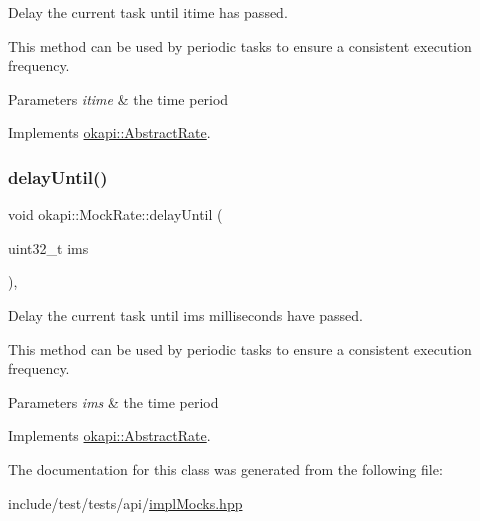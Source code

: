 Delay the current task until itime has passed. 

This method can be used by periodic tasks to ensure a consistent execution frequency.


\begin{DoxyParams}{Parameters}
{\em itime} & the time period \\
\hline
\end{DoxyParams}


Implements \mbox{\hyperlink{classokapi_1_1AbstractRate_a53a15074ca3bd0787ce34d30c068d9b2}{okapi\+::\+Abstract\+Rate}}.

\mbox{\label{classokapi_1_1MockRate_a61c3ec4590e3c7305f8882cf1b1d31d0}} 
\subsubsection{\texorpdfstring{delayUntil()}{delayUntil()}\hspace{0.1cm}{\footnotesize\ttfamily [2/2]}}
{\footnotesize\ttfamily void okapi\+::\+Mock\+Rate\+::delay\+Until (\begin{DoxyParamCaption}\item[{uint32\+\_\+t}]{ims }\end{DoxyParamCaption})\hspace{0.3cm}{\ttfamily [override]}, {\ttfamily [virtual]}}



Delay the current task until ims milliseconds have passed. 

This method can be used by periodic tasks to ensure a consistent execution frequency.


\begin{DoxyParams}{Parameters}
{\em ims} & the time period \\
\hline
\end{DoxyParams}


Implements \mbox{\hyperlink{classokapi_1_1AbstractRate_a3faf54ea2951ae5e0567cd50ddba0227}{okapi\+::\+Abstract\+Rate}}.



The documentation for this class was generated from the following file\+:\begin{DoxyCompactItemize}
\item 
include/test/tests/api/\mbox{\hyperlink{implMocks_8hpp}{impl\+Mocks.\+hpp}}\end{DoxyCompactItemize}
